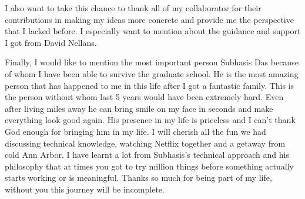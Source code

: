 I also want to take this chance to thank all of my collaborator for their
contributions in making my ideas more concrete and provide me the perspective
that I lacked before. I especially want to mention about the guidance and
support I got from David Nellans.

Finally, I would like to mention the most important person Subhasis Das because
of whom I have been able to survive the graduate school. He is the most amazing
person that has happened to me in this life after I got a fantastic family. This
is the person without whom last 5 years would have been extremely hard. Even
after living miles away he can bring smile on my face in seconds and make
everything look good again. His presence in my life is priceless and I can't
thank God enough for bringing him in my life.  I will cherish all the fun we had
discussing technical knowledge, watching Netflix together and a getaway from
cold Ann Arbor. I have learnt a lot from Subhasis's technical approach and his
philosophy that at times you got to try million things before something actually
starts working or is meaningful. Thanks so much for being part of my life,
without you this journey will be incomplete.
